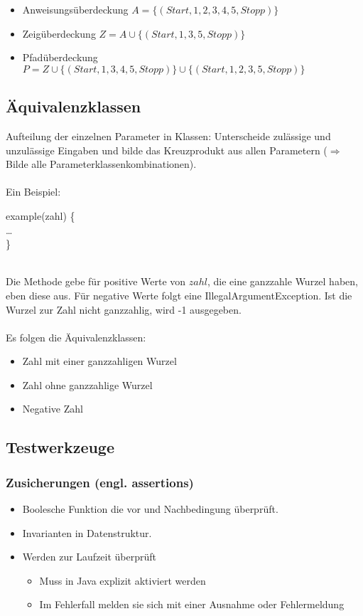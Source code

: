 \begin{itemize}
    \item Anweisungsüberdeckung
    $A = \{(Start,1,2,3,4,5,Stopp)\}$
    \item Zeigüberdeckung
    $Z = A \cup \{(Start,1,3,5,Stopp)\}$
    \item Pfadüberdeckung
    $P = Z \cup \{(Start,1,3,4,5,Stopp)\} \cup \{(Start,1,2,3,5, Stopp)\}$
\end{itemize}

\subsection{Äquivalenzklassen}
Aufteilung der einzelnen Parameter in Klassen: Unterscheide zulässige und unzulässige Eingaben und bilde das Kreuzprodukt aus allen Parametern ($\Rightarrow$ Bilde alle Parameterklassenkombinationen).
\\\\
Ein Beispiel:
\\
\begin{code}
    \javaPublic \javaInt example(\javaInt zahl) \{\\
    \quad\dots\ \\\}
\end{code}
\\
Die Methode gebe für positive Werte von $zahl$, die eine ganzzahle Wurzel haben, eben diese aus. Für negative Werte folgt eine IllegalArgumentException. Ist die Wurzel zur Zahl nicht ganzzahlig, wird -1 ausgegeben.
\\
\\
Es folgen die Äquivalenzklassen:
\begin{itemize}
    \item Zahl mit einer ganzzahligen Wurzel
    \item Zahl ohne ganzzahlige Wurzel
    \item Negative Zahl
\end{itemize}
\newpage
\subsection{Testwerkzeuge}
\subsubsection{Zusicherungen (engl. assertions)}
\begin{itemize}
    \item Boolesche Funktion die vor und Nachbedingung überprüft.
    \item Invarianten in Datenstruktur.
    \item Werden zur Laufzeit überprüft
    \begin{itemize}
        \item Muss in Java explizit aktiviert werden
        \item Im Fehlerfall melden sie sich mit einer Ausnahme oder Fehlermeldung
    \end{itemize}
\end{itemize}

